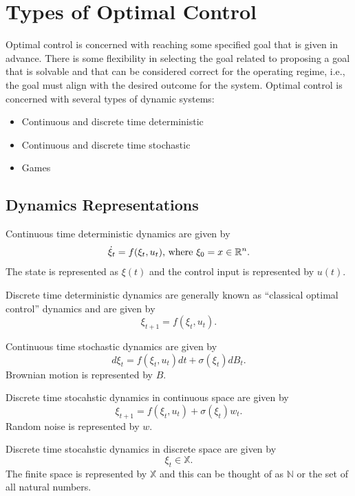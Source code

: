\mainmatter%
\setcounter{page}{1}

\lectureseries[\course]{\course}

\date{September 24, 2009}

\setaddress%

\setcounter{lecture}{0}
\setcounter{chapter}{0}


\section{Types of Optimal Control}
Optimal control is concerned with reaching some specified goal that is given in advance.
There is some flexibility in selecting the goal related to proposing a goal that is solvable and that can be considered correct for the operating regime, i.e., the goal must align with the desired outcome for the system.
Optimal control is concerned with several types of dynamic systems:

\begin{itemize}
  \item Continuous and discrete time deterministic
  \item Continuous and discrete time stochastic
  \item Games
\end{itemize}

\subsection{Dynamics Representations}
Continuous time deterministic dynamics are given by
$$\dot\xi_t = f(\xi_t,u_t) \textnormal{, where } \xi_0 = x \in \mathbb{R}^n.$$
The state is represented as $\xi(t)$ and the control input is represented by $u(t)$.

Discrete time deterministic dynamics are generally known as ``classical optimal control'' dynamics and are given by
$$\xi_{t+1} = f(\xi_t,u_t).$$

Continuous time stochastic dynamics are given by
$$d\xi_t = f(\xi_t,u_t)dt + \sigma(\xi_t)dB_t.$$
Brownian motion is represented by $B$.

Discrete time stocahstic dynamics in continuous space are given by
$$\xi_{t+1} = f(\xi_t,u_t) + \sigma(\xi_t)w_t.$$
Random noise is represented by $w$.

Discrete time stocahstic dynamics in discrete space are given by
$$\xi_t \in \mathbb{X}.$$
The finite space is represented by $\mathbb{X}$ and this can be thought of as $\mathbb{N}$ or the set of all natural numbers.

